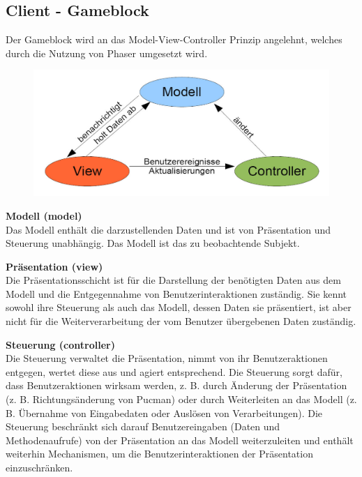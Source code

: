 \documentclass[11pt,a4paper]{article}
\begin{document}
\subsection{Client - Gameblock}
Der Gameblock wird an das Model-View-Controller Prinzip angelehnt, welches durch die Nutzung von Phaser umgesetzt wird. \par\bigskip
\begin{figure}[htb]
  \centering
  \includegraphics[scale=0.2]{mvc.jpg}
  \label{PNFs}
\end{figure} 




\textbf{Modell (model)} \\
Das Modell enthält die darzustellenden Daten und ist von Präsentation und Steuerung unabhängig. Das Modell ist das zu beobachtende Subjekt.\\

\par\bigskip \par\bigskip
\textbf{Präsentation (view)} \\
Die Präsentationsschicht ist für die Darstellung der benötigten Daten aus dem Modell und die Entgegennahme von Benutzerinteraktionen zuständig. Sie kennt sowohl ihre Steuerung als auch das Modell, dessen Daten sie präsentiert, ist aber nicht für die Weiterverarbeitung der vom Benutzer übergebenen Daten zuständig. \\

\par\bigskip \par\bigskip
\textbf{Steuerung (controller)} \\
Die Steuerung verwaltet die Präsentation, nimmt von ihr Benutzeraktionen entgegen, wertet diese aus und agiert entsprechend. Die Steuerung sorgt dafür, dass Benutzeraktionen wirksam werden, z. B. durch Änderung der Präsentation (z. B. Richtungsänderung von Pucman) oder  durch Weiterleiten an das Modell (z. B. Übernahme von Eingabedaten oder  Auslösen von Verarbeitungen). Die Steuerung beschränkt sich darauf Benutzereingaben (Daten und Methodenaufrufe) von der Präsentation an das Modell weiterzuleiten und enthält weiterhin Mechanismen, um die Benutzerinteraktionen der Präsentation einzuschränken.
\end{document}
